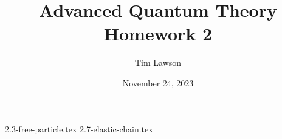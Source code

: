 \documentclass[a4paper]{extarticle}
\title{Advanced Quantum Theory\\
\large Homework 2}
\author{Tim Lawson}
\date{November 24, 2023}
\begin{document}
\maketitle

\setcounter{section}{2}
\setcounter{subsection}{2}
{2.3-free-particle.tex}
\setcounter{subsection}{6}
{2.7-elastic-chain.tex}
\end{document}
